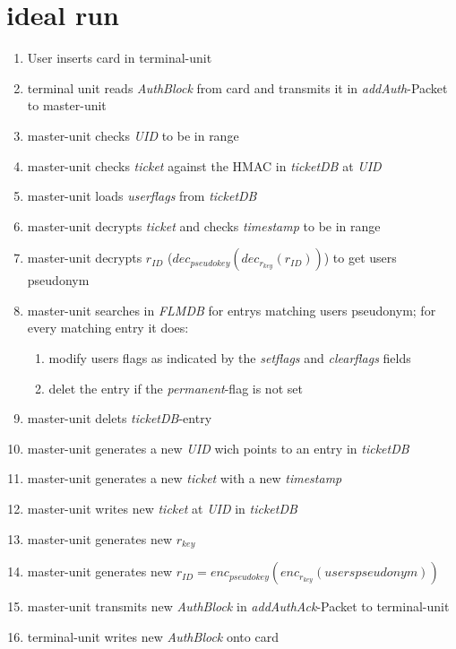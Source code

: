 \section{ideal run}
 \begin{enumerate}
 \item User inserts card in terminal-unit
 \item terminal unit reads \textit{AuthBlock} from card and transmits it in \textit{addAuth}-Packet to master-unit
 \item master-unit checks \textit{UID} to be in range
 \item master-unit checks \textit{ticket} against the HMAC in \textit{ticketDB} at \textit{UID}
 \item master-unit loads \textit{userflags} from \textit{ticketDB}
 \item master-unit decrypts \textit{ticket} and checks \textit{timestamp} to be in range
 \item master-unit decrypts \textit{$r_{ID}$} ($dec_{pseudokey}(dec_{r_{key}}(r_{ID}))$) to get users pseudonym
 \item master-unit searches in \textit{FLMDB} for entrys matching users pseudonym; for every matching entry it does:
  \begin{enumerate}
  \item modify users flags as indicated by the \textit{setflags} and \textit{clearflags} fields
  \item delet the entry if the \textit{permanent}-flag is not set
  \end{enumerate}
 \item master-unit delets \textit{ticketDB}-entry
 \item master-unit generates a new \textit{UID} wich points to an entry in \textit{ticketDB}
 \item master-unit generates a new \textit{ticket} with a new \textit{timestamp}
 \item master-unit writes new \textit{ticket} at \textit{UID} in \textit{ticketDB}
 \item master-unit generates new \textit{$r_{key}$}
 \item master-unit generates new \textit{$r_{ID}$}$=enc_{pseudokey}(enc_{r_{key}}(users pseudonym))$ 
 \item master-unit transmits new \textit{AuthBlock} in \textit{addAuthAck}-Packet to terminal-unit
 \item terminal-unit writes new \textit{AuthBlock} onto card
 \end{enumerate}
